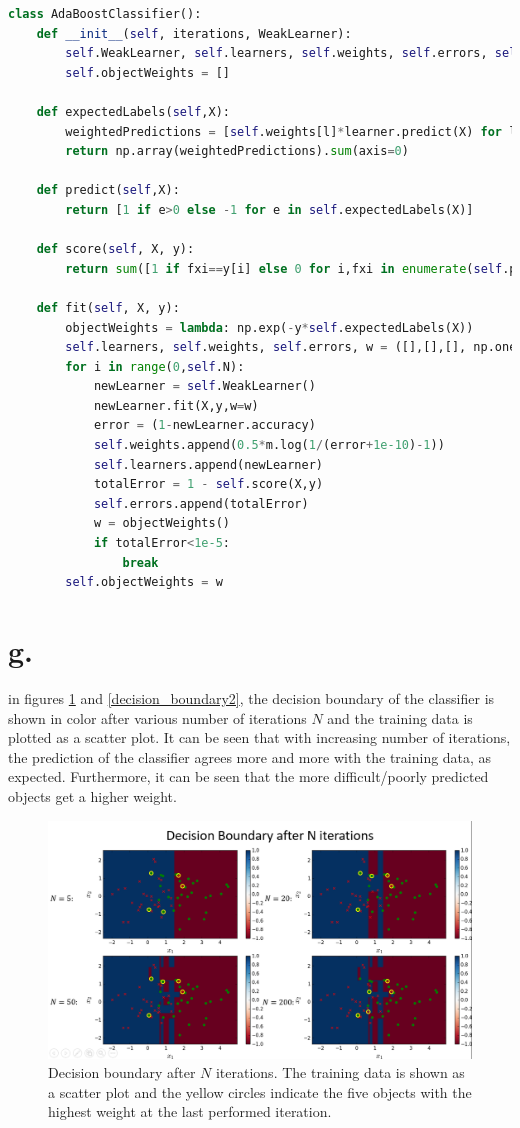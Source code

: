 \documentclass [a4paper] {report}
\begin{document}
	\begin{lstlisting}[language=python, frame=l, basicstyle=\ttfamily\scriptsize]		
class AdaBoostClassifier():
	def __init__(self, iterations, WeakLearner):
		self.WeakLearner, self.learners, self.weights, self.errors, self.N = WeakLearner, [], [], [], iterations
		self.objectWeights = []
	
	def expectedLabels(self,X):
		weightedPredictions = [self.weights[l]*learner.predict(X) for l,learner in enumerate(self.learners)]
		return np.array(weightedPredictions).sum(axis=0)
	
	def predict(self,X):
		return [1 if e>0 else -1 for e in self.expectedLabels(X)]
	
	def score(self, X, y):
		return sum([1 if fxi==y[i] else 0 for i,fxi in enumerate(self.predict(X))])/y.shape[0] 
	
	def fit(self, X, y):
		objectWeights = lambda: np.exp(-y*self.expectedLabels(X))
		self.learners, self.weights, self.errors, w = ([],[],[], np.ones(X.shape[0]))
		for i in range(0,self.N):
			newLearner = self.WeakLearner()
			newLearner.fit(X,y,w=w)
			error = (1-newLearner.accuracy)
			self.weights.append(0.5*m.log(1/(error+1e-10)-1))
			self.learners.append(newLearner)
			totalError = 1 - self.score(X,y)
			self.errors.append(totalError)
			w = objectWeights()
			if totalError<1e-5:
				break
		self.objectWeights = w 
	\end{lstlisting}
	
	\section*{g.}
	in figures \ref{decision_boundary1} and \ref{decision_boundary2}, the decision boundary of the classifier is shown in color after various number of iterations $N$ and the training data is plotted as a scatter plot. It can be seen that with increasing number of iterations, the prediction of the classifier agrees more and more with the training data, as expected. Furthermore, it can be seen that the more difficult/poorly predicted objects get a higher weight.
	
	\begin{figure}[H]
		\includegraphics[width = \textwidth]{Images/decision_boundary.png}
		\caption{Decision boundary after $N$ iterations. The training data is shown as a scatter plot and the yellow circles indicate the five objects with the highest weight at the last performed iteration. }
		\label{decision_boundary1}
	\end{figure}
\end{document}
